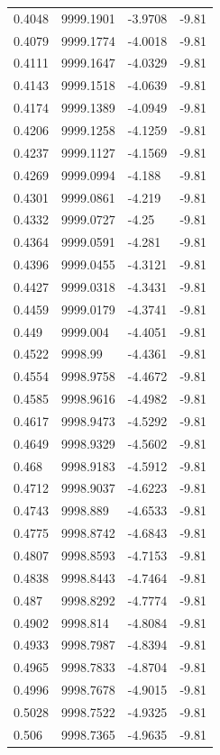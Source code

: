 \begin{table}[H]
\begin{tabular}{llll}
0.4048 & 9999.1901 & -3.9708 & -9.81 \\
0.4079 & 9999.1774 & -4.0018 & -9.81 \\
0.4111 & 9999.1647 & -4.0329 & -9.81 \\
0.4143 & 9999.1518 & -4.0639 & -9.81 \\
0.4174 & 9999.1389 & -4.0949 & -9.81 \\
0.4206 & 9999.1258 & -4.1259 & -9.81 \\
0.4237 & 9999.1127 & -4.1569 & -9.81 \\
0.4269 & 9999.0994 & -4.188 & -9.81 \\
0.4301 & 9999.0861 & -4.219 & -9.81 \\
0.4332 & 9999.0727 & -4.25 & -9.81 \\
0.4364 & 9999.0591 & -4.281 & -9.81 \\
0.4396 & 9999.0455 & -4.3121 & -9.81 \\
0.4427 & 9999.0318 & -4.3431 & -9.81 \\
0.4459 & 9999.0179 & -4.3741 & -9.81 \\
0.449 & 9999.004 & -4.4051 & -9.81 \\
0.4522 & 9998.99 & -4.4361 & -9.81 \\
0.4554 & 9998.9758 & -4.4672 & -9.81 \\
0.4585 & 9998.9616 & -4.4982 & -9.81 \\
0.4617 & 9998.9473 & -4.5292 & -9.81 \\
0.4649 & 9998.9329 & -4.5602 & -9.81 \\
0.468 & 9998.9183 & -4.5912 & -9.81 \\
0.4712 & 9998.9037 & -4.6223 & -9.81 \\
0.4743 & 9998.889 & -4.6533 & -9.81 \\
0.4775 & 9998.8742 & -4.6843 & -9.81 \\
0.4807 & 9998.8593 & -4.7153 & -9.81 \\
0.4838 & 9998.8443 & -4.7464 & -9.81 \\
0.487 & 9998.8292 & -4.7774 & -9.81 \\
0.4902 & 9998.814 & -4.8084 & -9.81 \\
0.4933 & 9998.7987 & -4.8394 & -9.81 \\
0.4965 & 9998.7833 & -4.8704 & -9.81 \\
0.4996 & 9998.7678 & -4.9015 & -9.81 \\
0.5028 & 9998.7522 & -4.9325 & -9.81 \\
0.506 & 9998.7365 & -4.9635 & -9.81 \\

\end{tabular}
\end{table}

